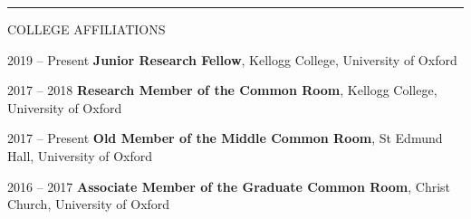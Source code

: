 \documentclass[10pt,a4paper]{article}
\begin{document}
\noindent\rule{\textwidth}{0.4pt}
\begin{cvlist}{COLLEGE AFFILIATIONS}
	
	\item[2019 -- Present]
	\textbf{Junior Research Fellow}, Kellogg College, University of Oxford
	
	\item[2017 -- 2018]
	\textbf{Research Member of the Common Room}, Kellogg College, University of Oxford
	
	\item[2017 -- Present]
	\textbf{Old Member of the Middle Common Room}, St Edmund Hall, University of Oxford
	
	\item[2016 -- 2017]
	\textbf{Associate Member of the Graduate Common Room}, Christ Church, University of Oxford
	
\end{cvlist}
\end{document}

